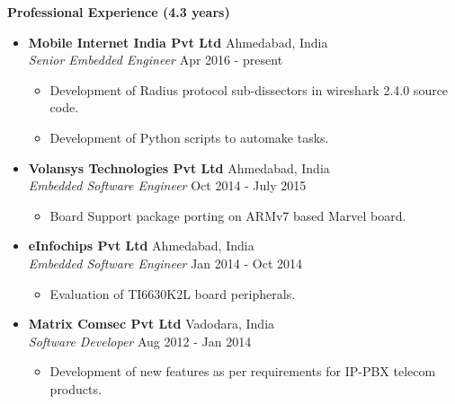 \documentclass[letterpaper,11pt]{article}
\newcommand{\resitem}[1]{\item #1 \vspace{-2pt}}
\newcommand{\resheading}[1]{{\large \colorbox{mygrey}{\begin{minipage}{\textwidth}{\textbf{#1 \vphantom{p\^{E}}}}\end{minipage}}}}
\begin{document}
\resheading{Professional Experience (4.3 years)}
\begin{itemize}

\item
	\textbf{Mobile Internet India Pvt Ltd} \hfill{Ahmedabad, India}\\
	\textit{Senior Embedded Engineer} \hfill{Apr 2016 - present}
	\begin{itemize} \vspace{-2mm}
		\resitem{Development of Radius protocol sub-dissectors in wireshark 2.4.0 source code.}
		\resitem{Development of Python scripts to automake tasks.}
	\end{itemize}

\item
	\textbf{Volansys Technologies Pvt Ltd} \hfill{Ahmedabad, India}\\
	\textit{Embedded Software Engineer} \hfill{Oct 2014 - July 2015} 
	\begin{itemize} \vspace{-2mm}
		\resitem{Board Support package porting on ARMv7 based Marvel board.}
	\end{itemize}

\item
	\textbf{eInfochips Pvt Ltd} \hfill{Ahmedabad, India}\\
	\textit{Embedded Software Engineer} \hfill{Jan 2014 - Oct 2014}
	\begin{itemize} \vspace{-2mm}
		\resitem{Evaluation of TI6630K2L board peripherals.}
	\end{itemize}

\item
	\textbf{Matrix Comsec Pvt Ltd} \hfill{Vadodara, India}\\
	\textit{Software Developer} \hfill{Aug 2012 - Jan 2014}
	\begin{itemize} \vspace{-2mm}
		\resitem{Development of new features as per requirements for IP-PBX telecom products.}
	\end{itemize}

\end{itemize}
\end{document}
